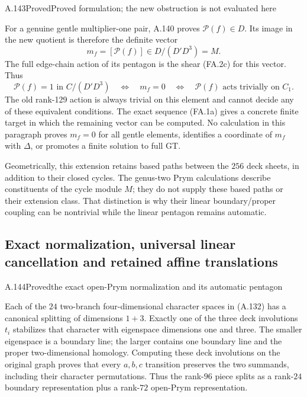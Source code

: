 \begin{statement}{A.143}{Proved}{Proved formulation; the new obstruction is not evaluated here}
\end{statement}
For a genuine gentle multiplier-one pair, A.140
proves $\mathcal P(f)\in D$. Its image in the
new quotient is therefore the definite vector
\[
           m_f=[\mathcal P(f)]\in D/(D'D^3)=M.
 \tag{FA.3a}
\]
The full edge-chain action of its pentagon is
the shear (FA.2c) for this vector. Thus
\[
 \mathcal P(f)=1\text{ in }C/(D'D^3)
 \quad\Longleftrightarrow\quad m_f=0
 \quad\Longleftrightarrow\quad
 \mathcal P(f)\text{ acts trivially on }C_1.
 \tag{FA.3b}
\]
The old rank-129 action is always trivial on
this element and cannot decide any of these
equivalent conditions. The exact sequence
(FA.1a) gives a concrete finite target in
which the remaining vector can be computed.
No calculation in this paragraph proves
$m_f=0$ for all gentle elements, identifies
a coordinate of $m_f$ with $\Delta$, or
promotes a finite solution to full GT.

Geometrically, this extension retains based
paths between the $256$ deck sheets, in
addition to their closed cycles. The genus-two
Prym calculations describe constituents of
the cycle module $M$; they do not supply
these based paths or their extension class.
That distinction is why their linear
boundary/proper coupling can be nontrivial
while the linear pentagon remains automatic.

\subsection{Exact normalization, universal linear cancellation and retained affine translations}


\begin{statement}{A.144}{Proved}{the exact open-Prym normalization and its automatic pentagon}
\end{statement}
Each of the $24$ two-branch four-dimensional character
spaces in (A.132) has a canonical splitting of dimensions
$1+3$. Exactly one of the three deck involutions $t_i$
stabilizes that character with eigenspace dimensions one
and three. The smaller eigenspace is a boundary line; the
larger contains one boundary line and the proper
two-dimensional homology. Computing these deck involutions
on the original graph proves that every $a,b,c$ transition
preserves the two summands, including their character
permutations. Thus the rank-$96$ piece splits as a
rank-$24$ boundary representation plus a rank-$72$ open-Prym
representation.

